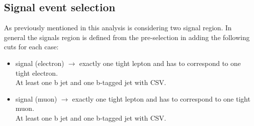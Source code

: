 \subsection{Signal event selection}
As previously mentioned in this analysis is considering two signal region. In general the signals region is defined from the pre-selection in adding the following cuts for each case:
\itemsep=0pt\topsep=0pt\partopsep=0pt
\begin{itemize}
\item signal (electron) $\rightarrow$ exactly one tight lepton and has to correspond to one tight electron. \\
At least one b jet and one b-tagged jet with CSV.
\item signal (muon) $\rightarrow$ exactly one tight lepton and has to correspond to one tight muon. \\
At least one b jet and one b-tagged jet with CSV.
\end{itemize}

